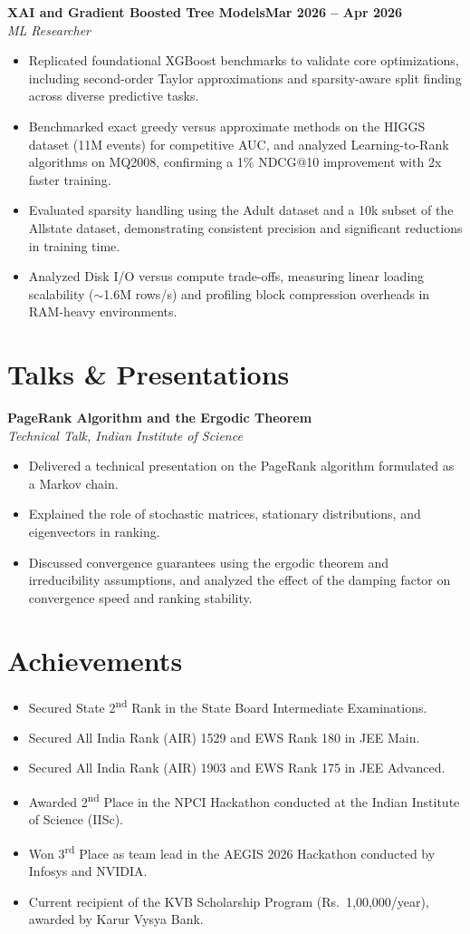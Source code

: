 \documentclass[10pt,a4paper]{article}
\newcommand{\entry}[4]{%
  \textbf{#1}\hfill\textbf{#2}\\
  {\small\textit{#3}}\hfill{\small\textit{#4}}\par}
\begin{document}
\entry{XAI and Gradient Boosted Tree Models}{Mar 2026 -- Apr 2026}{ML Researcher}{}
\begin{itemize}
  \item Replicated foundational XGBoost benchmarks to validate core optimizations, including second-order Taylor approximations and sparsity-aware split finding across diverse predictive tasks.
  \item Benchmarked exact greedy versus approximate methods on the HIGGS dataset (11M events) for competitive AUC, and analyzed Learning-to-Rank algorithms on MQ2008, confirming a 1\% NDCG@10 improvement with 2x faster training.
  \item Evaluated sparsity handling using the Adult dataset and a 10k subset of the Allstate dataset, demonstrating consistent precision and significant reductions in training time.
  \item Analyzed Disk I/O versus compute trade-offs, measuring linear loading scalability ($\sim$1.6M rows/s) and profiling block compression overheads in RAM-heavy environments.
\end{itemize}

\section*{Talks \& Presentations}
\entry{PageRank Algorithm and the Ergodic Theorem}{}{Technical Talk, Indian Institute of Science}{}
\begin{itemize}
  \item Delivered a technical presentation on the PageRank algorithm formulated as a Markov chain.
  \item Explained the role of stochastic matrices, stationary distributions, and eigenvectors in ranking.
  \item Discussed convergence guarantees using the ergodic theorem and irreducibility assumptions, and analyzed the effect of the damping factor on convergence speed and ranking stability.
\end{itemize}

\section*{Achievements}
\begin{itemize}
  \item Secured State 2\textsuperscript{nd} Rank in the State Board Intermediate Examinations.
  \item Secured All India Rank (AIR) 1529 and EWS Rank 180 in JEE Main.
  \item Secured All India Rank (AIR) 1903 and EWS Rank 175 in JEE Advanced.
  \item Awarded 2\textsuperscript{nd} Place in the NPCI Hackathon conducted at the Indian Institute of Science (IISc).
  \item Won 3\textsuperscript{rd} Place as team lead in the AEGIS 2026 Hackathon conducted by Infosys and NVIDIA.
  \item Current recipient of the KVB Scholarship Program (Rs.\ 1,00,000/year), awarded by Karur Vysya Bank.
\end{itemize}
\end{document}
